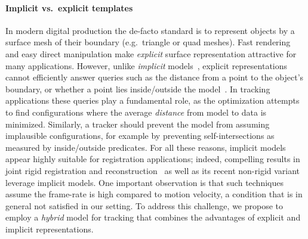

\paragraph{Implicit vs.\ explicit templates}
In modern digital production the de-facto standard is to represent objects by a surface mesh of their boundary (e.g.\ triangle or quad meshes). Fast rendering and easy direct manipulation make \emph{explicit} surface representation attractive for many applications.
%
However, unlike \emph{implicit} models~\cite{bloomenthal1997book}, explicit representations cannot efficiently answer queries such as the distance from a point to the object's boundary, or whether a point lies inside/outside the model~\cite[Ch.1]{botsch2010book}. In tracking applications these queries play a fundamental role, as the optimization attempts to find configurations where the average \emph{distance} from model to data is minimized. Similarly, a tracker should prevent the model from assuming implausible configurations, for example by preventing self-intersections as measured by inside/outside predicates. For all these reasons, implicit models appear highly suitable for registration applications; indeed, compelling results in joint rigid registration and reconstruction~\cite{newcombe2011kinfu} as well as its recent non-rigid variant~\cite{newcombe2015dynfusion} leverage implicit models. One important observation is that such techniques assume the frame-rate is high compared to motion velocity, a condition that is in general not satisfied in our setting.  To address this challenge, we propose to employ a \emph{hybrid} model for tracking that combines the advantages of explicit and implicit representations.


